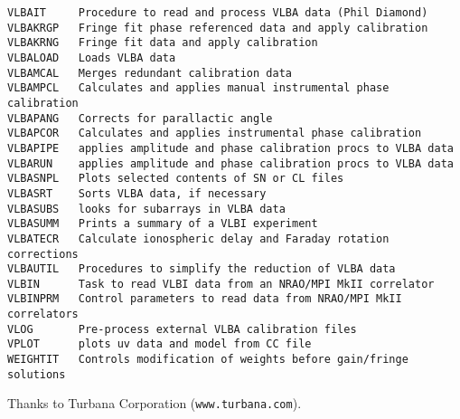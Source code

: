 \begin{verbatim}
VLBAIT     Procedure to read and process VLBA data (Phil Diamond)
VLBAKRGP   Fringe fit phase referenced data and apply calibration
VLBAKRNG   Fringe fit data and apply calibration
VLBALOAD   Loads VLBA data
VLBAMCAL   Merges redundant calibration data
VLBAMPCL   Calculates and applies manual instrumental phase calibration
VLBAPANG   Corrects for parallactic angle
VLBAPCOR   Calculates and applies instrumental phase calibration
VLBAPIPE   applies amplitude and phase calibration procs to VLBA data
VLBARUN    applies amplitude and phase calibration procs to VLBA data
VLBASNPL   Plots selected contents of SN or CL files
VLBASRT    Sorts VLBA data, if necessary
VLBASUBS   looks for subarrays in VLBA data
VLBASUMM   Prints a summary of a VLBI experiment
VLBATECR   Calculate ionospheric delay and Faraday rotation corrections
VLBAUTIL   Procedures to simplify the reduction of VLBA data
VLBIN      Task to read VLBI data from an NRAO/MPI MkII correlator
VLBINPRM   Control parameters to read data from NRAO/MPI MkII correlators
VLOG       Pre-process external VLBA calibration files
VPLOT      plots uv data and model from CC file
WEIGHTIT   Controls modification of weights before gain/fringe solutions
\end{verbatim}\eve

\normalsize

\vfill\eject
{}


\bre
{}
\item[ ]{\hfill Thanks to Turbana Corporation ({\tt www.turbana.com}).}
\ere

